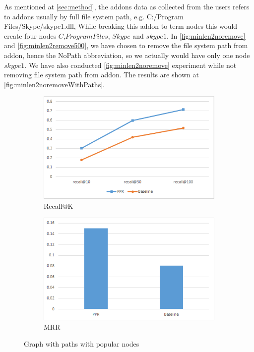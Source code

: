 \documentclass[11pt,oneside]{book}
\begin{document}
As mentioned at \autoref{sec:method}, the addons data as collected from the users refers to addons usually by full file system path, e.g. C:/Program Files/Skype/skype1.dll, While breaking this addon to term nodes this would create four nodes $C$,$Program Files$, $Skype$ and $skype1$. In \autoref{fig:minlen2noremove} and \autoref{fig:minlen2remove500}, we have chosen to remove the file system path from addon, hence the NoPath abbreviation, so we actually would have only one node $skype1$. We have also conducted \autoref{fig:minlen2noremove} experiment while not removing file system path from addon. The results are shown at \autoref{fig:minlen2noremoveWithPaths}.

\begin{figure}[h]
\centering
\begin{subfigure}[b]{0.49\textwidth}
	\centering
\includegraphics[scale=0.49]{figures/minlen2noremoveWithPaths.png}
\caption{Recall@K}
\label{fig:minlen2noremoveRecall}
\end{subfigure}
\begin{subfigure}[b]{0.49\textwidth}
	\centering
\includegraphics[scale=0.49]{figures/minlen2noremoveWithPathsMRR.png}
\caption{MRR}
\label{fig:minlen2noremoveMRR}
\end{subfigure}
\caption{Graph with paths with popular nodes}
	\label{fig:minlen2noremoveWithPaths}
\end{figure}
\end{document}

